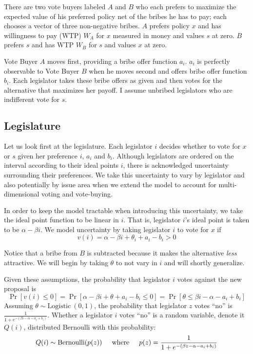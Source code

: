 \documentclass[12pt]{article}
\newcommand{\ve}{\theta}
\begin{document}
There are two vote buyers labeled $A$ and $B$ who each prefers to maximize the expected value of his preferred policy net of the bribes he has to pay; each chooses a vector of three non-negative bribes. $A$ prefers policy $x$ and has willingness to pay (WTP) $W_A$ for $x$ measured in money and values $s$ at zero. $B$ prefers $s$ and has WTP $W_B$ for $s$ and values $x$ at zero.

Vote Buyer $A$ moves first, providing a bribe offer function $a_i$. $a_i$ is perfectly observable to Vote Buyer $B$ when he moves second and offers bribe offer function $b_i$. Each legislator takes these bribe offers as given and then votes for the alternative that maximizes her payoff. I assume unbribed legislators who are indifferent vote for $s$.

\subsection{Legislature}
Let us look first at the legislature. Each legislator $i$ decides whether to vote for $x$ or $s$ given her preference $i$, $a_i$ and $b_i$. Although legislators are ordered on the interval according to their ideal points $i$, there is acknowledged uncertainty surrounding their preferences. We take this uncertainty to vary by legislator and also potentially by issue area when we extend the model to account for multi-dimensional voting and vote-buying.

In order to keep the model tractable when introducing this uncertainty, we take the ideal point function to be linear in $i$. That is, legislator $i$'s ideal point is taken to be $\alpha -\beta i$. We model uncertainty by taking legislator $i$ to vote for $x$ if 
			  \[
				  v(i) = \alpha -\beta i + \ve_i + a_i - b_i > 0
				\]
		
Notice that a bribe from $B$ is subtracted because it makes the alternative \textit{less} attractive.	We will begin by taking $\ve$ to not vary in $i$ and will shortly generalize.

Given these assumptions, the probability that legislator $i$ votes against the new proposal is
	\[
					\Pr\left[v(i)\leq 0 \right] = \Pr\left[\alpha -\beta i + \ve + a_i - b_i \leq 0 \right] = \Pr\left[\ve \leq \beta i - \alpha - a_i + b_i \right] 
	\]
Assuming $\ve \sim \text{Logistic} \ (0,1)$, the probability that legislator $z$ votes ``no'' is $\frac{1}{1+e^{-\left(\beta i - \alpha - a_i + b_i \right)}}$.	Whether a legislator $i$ votes ``no'' is a random variable, denote it $Q(i)$, distributed Bernoulli with this probability:
	\[
		Q(i) \sim \text{Bernoulli}(p(z)) \hskip.2in \text{where} \hskip.2in p(z) = \frac{1}{1+e^{-\left(\beta z - \alpha -a_i+ b_i \right)}}
	\]
\end{document}
